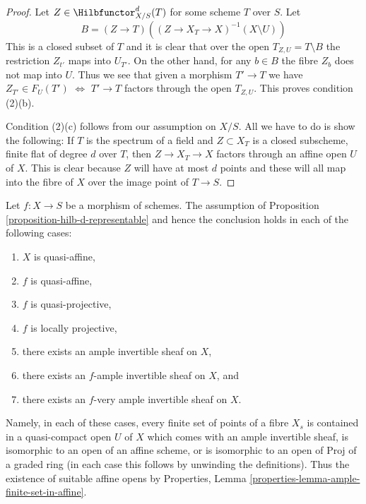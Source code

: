 \begin{proof}
\medskip\noindent
Let $Z \in \Hilbfunctor^d_{X/S}(T)$ for some scheme $T$ over $S$. Let
$$
B = (Z \to T)\left((Z \to X_T \to X)^{-1}(X \setminus U)\right)
$$
This is a closed subset of $T$ and it is clear that over the open
$T_{Z, U} = T \setminus B$ the restriction $Z_{t'}$ maps into $U_{T'}$.
On the other hand, for any $b \in B$ the fibre $Z_b$ does not map
into $U$. Thus we see that given a morphism $T' \to T$ we
have $Z_{T'} \in F_U(T')$ $\Leftrightarrow$ $T' \to T$ factors through
the open $T_{Z, U}$. This proves condition (2)(b).

\medskip\noindent
Condition (2)(c) follows from our assumption on $X/S$. All we have
to do is show the following: If $T$ is the spectrum of a field
and $Z \subset X_T$ is a closed subscheme, finite flat of degree
$d$ over $T$, then $Z \to X_T \to X$ factors through an affine open
$U$ of $X$. This is clear because $Z$ will have at most $d$ points
and these will all map into the fibre of $X$ over the image point
of $T \to S$.
\end{proof}

\begin{remark}
\label{remark-when-proposition-applies}
Let $f : X \to S$ be a morphism of schemes. The assumption of
Proposition \ref{proposition-hilb-d-representable} and
hence the conclusion holds in each of the following cases:
\begin{enumerate}
\item $X$ is quasi-affine,
\item $f$ is quasi-affine,
\item $f$ is quasi-projective,
\item $f$ is locally projective,
\item there exists an ample invertible sheaf on $X$,
\item there exists an $f$-ample invertible sheaf on $X$, and
\item there exists an $f$-very ample invertible sheaf on $X$.
\end{enumerate}
Namely, in each of these cases, every finite set of points of
a fibre $X_s$ is contained in a quasi-compact open $U$ of $X$
which comes with an ample invertible sheaf, is isomorphic
to an open of an affine scheme, or is isomorphic to an open
of $\text{Proj}$ of a graded ring (in each case this follows
by unwinding the definitions). Thus the existence of suitable
affine opens by
Properties, Lemma \ref{properties-lemma-ample-finite-set-in-affine}.
\end{remark}




